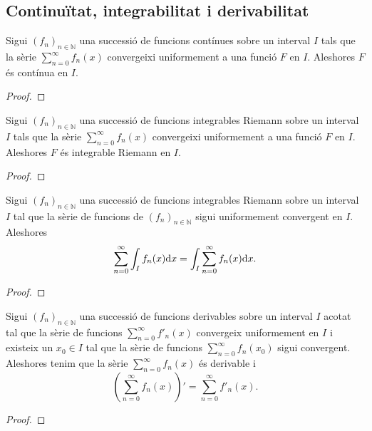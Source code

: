 \documentclass[../Apunts.tex]{subfiles}
\begin{document}
	\subsection{Continuïtat, integrabilitat i derivabilitat}
	\begin{theorem}
		\label{thm:si la sèrie de d'una successió de funcions contínues convergeix uniformement, el seu límit és una funció contínua}
		Sigui \((f_{n})_{n\in\mathbb{N}}\) una successió de funcions contínues sobre un interval \(I\) tals que la sèrie \(\sum_{n=0}^{\infty}f_{n}(x)\) convergeixi uniformement a una funció \(F\) en \(I\). Aleshores \(F\) és contínua en \(I\).
		\begin{proof}
		\end{proof}
	\end{theorem}
	\begin{theorem}
		\label{thm:si la sèrie de d'una successió de funcions integrables Riemann convergeix uniformement, el seu límit és una funció integrable Riemann}
		Sigui \((f_{n})_{n\in\mathbb{N}}\) una successió de funcions integrables Riemann sobre un interval \(I\) tals que la sèrie \(\sum_{n=0}^{\infty}f_{n}(x)\) convergeixi uniformement a una funció \(F\) en \(I\). Aleshores \(F\) és integrable Riemann en \(I\).
		\begin{proof}
		\end{proof}
	\end{theorem}
	\begin{theorem}
		\label{thm:si la sèrie d'una successió de funcions convergeix uniformement aleshores el límit de la integral dels elements de la sèrie de la succesió és la integral del límit del la sèrie de la successió}
		Sigui \((f_{n})_{n\in\mathbb{N}}\) una successió de funcions integrables Riemann sobre un interval \(I\) tal que la sèrie de funcions de \((f_{n})_{n\in\mathbb{N}}\) sigui uniformement convergent en \(I\). Aleshores
		\[\sum_{n=0}^{\infty}\int_{I}f_{n}(x)\mathrm{d} x=\int_{I}\sum_{n=0}^{\infty}f_{n}(x)\mathrm{d} x.\]
		\begin{proof}
		\end{proof}
	\end{theorem}
	\begin{theorem}
		\label{thm:condició per la derivabilitat d'una sèrie de funcions}
		Sigui \((f_{n})_{n\in\mathbb{N}}\) una successió de funcions derivables sobre un interval \(I\) acotat tal que la sèrie de funcions \(\sum_{n=0}^{\infty}f'_{n}(x)\) convergeix uniformement en \(I\) i existeix un \(x_{0}\in I\) tal que la sèrie de funcions \(\sum_{n=0}^{\infty}f_{n}(x_{0})\) sigui convergent. Aleshores tenim que la sèrie \(\sum_{n=0}^{\infty}f_{n}(x)\) és derivable i
		\[\left(\sum_{n=0}^{\infty}f_{n}(x)\right)'=\sum_{n=0}^{\infty}f'_{n}(x).\]
		\begin{proof}
		\end{proof}
	\end{theorem}
\end{document}
